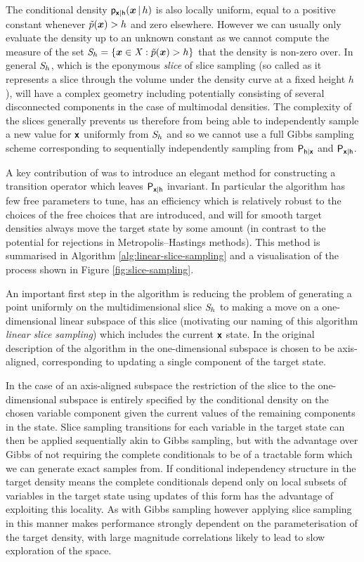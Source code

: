 The conditional density $\mathsf{p}_{\boldsymbol{\mathsf{x}}|\mathsf{h}}(\boldsymbol{x}\operatorname{|} h)$ is also locally uniform, equal to a positive constant whenever $\tilde{p}(\boldsymbol{x}) > h$ and zero elsewhere. However we can usually only evaluate the density up to an unknown constant as we cannot compute the measure of the set $\set{S}_h = \fset{\vct{x} \in \set{X} : \utgtdens(\vct{x}) > h}$ that the density is non-zero over. In general $\mathit{S}_h$, which is the eponymous \emph{slice} of slice sampling (so called as it represents a slice through the volume under the density curve at a fixed height $h$), will have a complex geometry including potentially consisting of several disconnected components in the case of multimodal densities. The complexity of the slices generally prevents us therefore from being able to independently sample a new value for $\boldsymbol{\mathsf{x}}$ uniformly from $\mathit{S}_h$ and so we cannot use a full Gibbs sampling scheme corresponding to sequentially independently sampling from $\mathsf{P}_{\mathsf{h}|\boldsymbol{\mathsf{x}}}$ and $\mathsf{P}_{\boldsymbol{\mathsf{x}}|\mathsf{h}}$.

A key contribution of \citep{neal2003slice} was to introduce an elegant method for constructing a transition operator which leaves $\mathsf{P}_{\boldsymbol{\mathsf{x}}|\mathsf{h}}$ invariant. In particular the algorithm has few free parameters to tune, has an efficiency which is relatively robust to the choices of the free choices that are introduced, and will for smooth target densities always move the target state by some amount (in contrast to the potential for rejections in Metropolis--Hastings methods). This method is summarised in Algorithm \ref{alg:linear-slice-sampling} and a visualisation of the process shown in Figure \ref{fig:slice-sampling}.

An important first step in the algorithm is reducing the problem of generating a point uniformly on the multidimensional slice $\mathit{S}_h$ to making a move on a one-dimensional linear subspace of this slice  (motivating our naming of this algorithm \emph{linear slice sampling}) which includes the current $\boldsymbol{\mathsf{x}}$ state. In the original description of the algorithm in \citep{neal2003slice} the one-dimensional subspace is chosen to be axis-aligned, corresponding to updating a single component of the target state. 

In the case of an axis-aligned subspace the restriction of the slice to the one-dimensional subspace is entirely specified by the conditional density on the chosen variable component given the current values of the remaining components in the state. Slice sampling transitions for each variable in the target state can then be applied sequentially akin to Gibbs sampling, but with the advantage over Gibbs of not requiring the complete conditionals to be of a tractable form which we can generate exact samples from. If conditional independency structure in the target density means the complete conditionals depend only on local subsets of variables in the target state using updates of this form has the advantage of exploiting this locality. As with Gibbs sampling however applying slice sampling in this manner makes performance strongly dependent on the parameterisation of the target density, with large magnitude correlations likely to lead to slow exploration of the space. 

